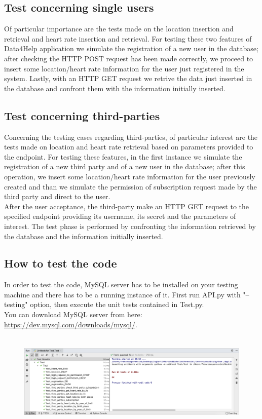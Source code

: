 \documentclass{article}
\begin{document}
\subsection{Test concerning single users}
Of particular importance are the tests made on the location insertion and retrieval and heart rate insertion and retrieval.
For testing these two features of Data4Help application we simulate the registration of a new user in the database; after checking the HTTP POST request has been made correctly, we proceed to insert some location/heart rate information for the user just registered in the system. Lastly, with an HTTP GET request we retrive the data just inserted in the database and confront them with the information initially inserted.

\subsection{Test concerning third-parties}
Concerning the testing cases regarding third-parties, of particular interest are the tests made on location and heart rate retrieval based on parameters provided to the endpoint.
For testing these features, in the first instance we simulate the registration of a new third party and of a new user in the database; after this operation, we insert some location/heart rate information for the user previously created and than we simulate the permission of subscription request made by the third party and direct to the user. \\
After the user acceptance, the third-party make an HTTP GET request to the specified endpoint providing its username, its secret and the parameters of interest.
The test phase is performed by confronting the information retrieved by the database and the information initially inserted.  
\newpage
\subsection{How to test the code}

In order to test the code, MySQL server has to be installed on your testing machine and there has to be a running instance of it.
First run API.py with "--testing" option, then execute the unit tests contained in Test.py.\\
You can download MySQL server from here: \url{https://dev.mysql.com/downloads/mysql/}.


\begin{figure}[h!]
\centering
	\includegraphics[height=4.7cm,keepaspectratio]{Figures/tests}
\end{figure}
\end{document}
